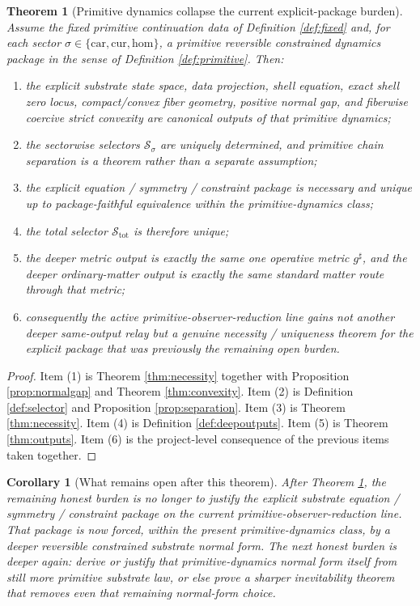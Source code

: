 \documentclass[11pt]{article}
\newcommand{\CompletedMetric}{g^{\sharp}}
\newcommand{\Car}{\mathrm{car}}
\newcommand{\Cur}{\mathrm{cur}}
\newcommand{\Hom}{\mathrm{hom}}
\newcommand{\ChainSelect}[1]{\mathcal S_{#1}}
\newcommand{\ChainSelectTriple}{\mathcal S_{\mathrm{tot}}}
\newtheorem{corollary}{Corollary}
\newtheorem{theorem}{Theorem}
\begin{document}
\begin{theorem}[Primitive dynamics collapse the current explicit-package burden]
\label{thm:main}
Assume the fixed primitive continuation data of Definition \ref{def:fixed} and, for each sector \(\sigma\in\{\Car,\Cur,\Hom\}\), a primitive reversible constrained dynamics package in the sense of Definition \ref{def:primitive}. Then:
\begin{enumerate}
    \item the explicit substrate state space, data projection, shell equation, exact shell zero locus, compact/convex fiber geometry, positive normal gap, and fiberwise coercive strict convexity are canonical outputs of that primitive dynamics;
    \item the sectorwise selectors \(\ChainSelect{\sigma}\) are uniquely determined, and primitive chain separation is a theorem rather than a separate assumption;
    \item the explicit equation / symmetry / constraint package is necessary and unique up to package-faithful equivalence within the primitive-dynamics class;
    \item the total selector \(\ChainSelectTriple\) is therefore unique;
    \item the deeper metric output is exactly the same one operative metric \(\CompletedMetric\), and the deeper ordinary-matter output is exactly the same standard matter route through that metric;
    \item consequently the active primitive-observer-reduction line gains not another deeper same-output relay but a genuine necessity / uniqueness theorem for the explicit package that was previously the remaining open burden.
\end{enumerate}
\end{theorem}

\begin{proof}
Item (1) is Theorem \ref{thm:necessity} together with Proposition \ref{prop:normalgap} and Theorem \ref{thm:convexity}. Item (2) is Definition \ref{def:selector} and Proposition \ref{prop:separation}. Item (3) is Theorem \ref{thm:necessity}. Item (4) is Definition \ref{def:deepoutputs}. Item (5) is Theorem \ref{thm:outputs}. Item (6) is the project-level consequence of the previous items taken together.
\end{proof}

\begin{corollary}[What remains open after this theorem]
\label{cor:next}
After Theorem \ref{thm:main}, the remaining honest burden is no longer to justify the explicit substrate equation / symmetry / constraint package on the current primitive-observer-reduction line. That package is now forced, within the present primitive-dynamics class, by a deeper reversible constrained substrate normal form. The next honest burden is deeper again: derive or justify that primitive-dynamics normal form itself from still more primitive substrate law, or else prove a sharper inevitability theorem that removes even that remaining normal-form choice.
\end{corollary}
\end{document}
